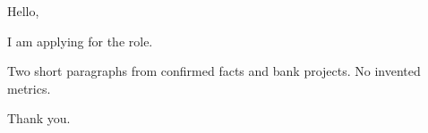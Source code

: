 \documentclass[11pt]{article}
\begin{document}
Hello,

I am applying for the role.

Two short paragraphs from confirmed facts and bank projects. No invented metrics.

Thank you.
\end{document}
